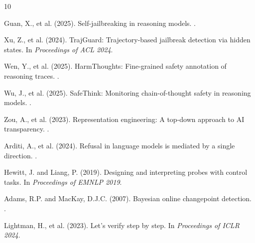 \documentclass[11pt,a4paper]{article}
\begin{document}
\begin{thebibliography}{10}

Guan, X., et al. (2025).
\newblock Self-jailbreaking in reasoning models.
.

Xu, Z., et al. (2024).
\newblock TrajGuard: Trajectory-based jailbreak detection via hidden states.
\newblock In {\em Proceedings of ACL 2024}.

Wen, Y., et al. (2025).
\newblock HarmThoughts: Fine-grained safety annotation of reasoning traces.
.

Wu, J., et al. (2025).
\newblock SafeThink: Monitoring chain-of-thought safety in reasoning models.
.

Zou, A., et al. (2023).
\newblock Representation engineering: A top-down approach to AI transparency.
.

Arditi, A., et al. (2024).
\newblock Refusal in language models is mediated by a single direction.
.

Hewitt, J. and Liang, P. (2019).
\newblock Designing and interpreting probes with control tasks.
\newblock In {\em Proceedings of EMNLP 2019}.

Adams, R.P. and MacKay, D.J.C. (2007).
\newblock Bayesian online changepoint detection.
.

Lightman, H., et al. (2023).
\newblock Let's verify step by step.
\newblock In {\em Proceedings of ICLR 2024}.

\end{thebibliography}
\end{document}
